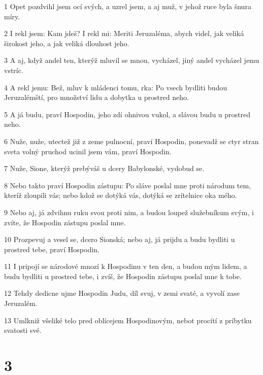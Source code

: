 \par 1 Opet pozdvihl jsem ocí svých, a uzrel jsem, a aj muž, v jehož ruce byla šnura míry.
\par 2 I rekl jsem: Kam jdeš? I rekl mi: Meriti Jeruzaléma, abych videl, jak veliká širokost jeho, a jak veliká dlouhost jeho.
\par 3 A aj, když andel ten, kterýž mluvil se mnou, vycházel, jiný andel vycházel jemu vstríc.
\par 4 A rekl jemu: Bež, mluv k mládenci tomu, rka: Po vsech bydliti budou Jeruzalémští, pro množství lidu a dobytka u prostred neho.
\par 5 A já budu, praví Hospodin, jeho zdí ohnivou vukol, a slávou budu u prostred neho.
\par 6 Nuže, nuže, utectež již z zeme pulnocní, praví Hospodin, ponevadž se ctyr stran sveta volný pruchod ucinil jsem vám, praví Hospodin.
\par 7 Nuže, Sione, kterýž prebýváš u dcery Babylonské, vydobud se.
\par 8 Nebo takto praví Hospodin zástupu: Po sláve poslal mne proti národum tem, kteríž zloupili vás; nebo kdož se dotýká vás, dotýká se zrítelnice oka mého.
\par 9 Nebo aj, já zdvihnu ruku svou proti nim, a budou loupež služebníkum svým, i zvíte, že Hospodin zástupu poslal mne.
\par 10 Prozpevuj a vesel se, dcero Sionská; nebo aj, já prijdu a budu bydliti u prostred tebe, praví Hospodin.
\par 11 I pripojí se národové mnozí k Hospodinu v ten den, a budou mým lidem, a budu bydliti u prostred tebe, i zvíš, že Hospodin zástupu poslal mne k tobe.
\par 12 Tehdy dedicne ujme Hospodin Judu, díl svuj, v zemi svaté, a vyvolí zase Jeruzalém.
\par 13 Umlkniž všeliké telo pred oblícejem Hospodinovým, nebot procítí z príbytku svatosti své.

\chapter{3}

